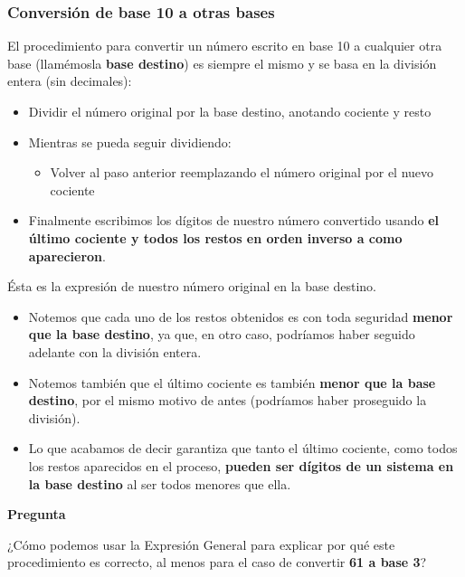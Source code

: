 \documentclass[spanish,a4paper,]{article}
\providecommand{\tightlist}{%
  \setlength{\itemsep}{0pt}\setlength{\parskip}{0pt}}
\begin{document}
\hypertarget{conversiuxf3n-de-base-10-a-otras-bases}{%
\subsubsection{Conversión de base 10 a otras
bases}\label{conversiuxf3n-de-base-10-a-otras-bases}}

El procedimiento para convertir un número escrito en base 10 a cualquier
otra base (llamémosla \textbf{base destino}) es siempre el mismo y se
basa en la división entera (sin decimales):

\begin{itemize}
\tightlist
\item
  Dividir el número original por la base destino, anotando cociente y
  resto
\item
  Mientras se pueda seguir dividiendo:

  \begin{itemize}
  \tightlist
  \item
    Volver al paso anterior reemplazando el número original por el nuevo
    cociente
  \end{itemize}
\item
  Finalmente escribimos los dígitos de nuestro número convertido usando
  \textbf{el último cociente y todos los restos en orden inverso a como
  aparecieron}.
\end{itemize}

Ésta es la expresión de nuestro número original en la base destino.

\begin{itemize}
\tightlist
\item
  Notemos que cada uno de los restos obtenidos es con toda seguridad
  \textbf{menor que la base destino}, ya que, en otro caso, podríamos
  haber seguido adelante con la división entera.
\item
  Notemos también que el último cociente es también \textbf{menor que la
  base destino}, por el mismo motivo de antes (podríamos haber
  proseguido la división).
\item
  Lo que acabamos de decir garantiza que tanto el último cociente, como
  todos los restos aparecidos en el proceso, \textbf{pueden ser dígitos
  de un sistema en la base destino} al ser todos menores que ella.
\end{itemize}

\textbf{Pregunta}

¿Cómo podemos usar la Expresión General para explicar por qué este
procedimiento es correcto, al menos para el caso de convertir \textbf{61
a base 3}?
\end{document}

